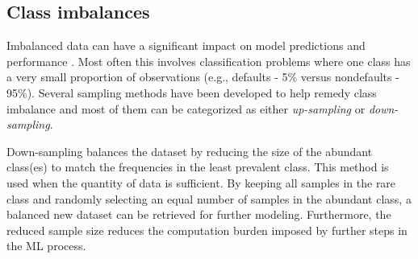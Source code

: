 \documentclass[]{krantz}
\makeatletter
\newenvironment{Shaded}{\begin{snugshade}}{\end{snugshade}}
\newcommand{\CommentTok}[1]{\textcolor[rgb]{0.37,0.37,0.37}{\textit{#1}}}
\newcommand{\DataTypeTok}[1]{\textcolor[rgb]{0.27,0.27,0.27}{#1}}
\newcommand{\DecValTok}[1]{\textcolor[rgb]{0.06,0.06,0.06}{#1}}
\newcommand{\FloatTok}[1]{\textcolor[rgb]{0.06,0.06,0.06}{#1}}
\newcommand{\KeywordTok}[1]{\textcolor[rgb]{0.27,0.27,0.27}{\textbf{#1}}}
\newcommand{\NormalTok}[1]{#1}
\newcommand{\OperatorTok}[1]{\textcolor[rgb]{0.43,0.43,0.43}{\textbf{#1}}}
\newcommand{\StringTok}[1]{\textcolor[rgb]{0.5,0.5,0.5}{#1}}
\newenvironment{kframe}{%
\medskip{}
\setlength{\fboxsep}{.8em}
 \def\at@end@of@kframe{}%
 \ifinner\ifhmode%
  \def\at@end@of@kframe{\end{minipage}}%
  \begin{minipage}{\columnwidth}%
 \fi\fi%
 \def\FrameCommand##1{\hskip\@totalleftmargin \hskip-\fboxsep
 \colorbox{shadecolor}{##1}\hskip-\fboxsep
     \hskip-\linewidth \hskip-\@totalleftmargin \hskip\columnwidth}%
 \MakeFramed {\advance\hsize-\width
   \@totalleftmargin\z@ \linewidth\hsize
   \@setminipage}}%
 {\par\unskip\endMakeFramed%
 \at@end@of@kframe}
\renewenvironment{Shaded}{\begin{kframe}}{\end{kframe}}
\makeatother
\begin{document}
\begin{Shaded}
\end{Shaded}

\hypertarget{class-imbalances}{%
\subsection{Class imbalances}\label{class-imbalances}}

Imbalanced data can have a significant impact on model predictions and performance \citep{apm}. Most often this involves classification problems where one class has a very small proportion of observations (e.g., defaults - 5\% versus nondefaults - 95\%). Several sampling methods have been developed to help remedy class imbalance and most of them can be categorized as either \emph{up-sampling} or \emph{down-sampling}.

Down-sampling balances the dataset by reducing the size of the abundant class(es) to match the frequencies in the least prevalent class. This method is used when the quantity of data is sufficient. By keeping all samples in the rare class and randomly selecting an equal number of samples in the abundant class, a balanced new dataset can be retrieved for further modeling. Furthermore, the reduced sample size reduces the computation burden imposed by further steps in the ML process.
\end{document}
